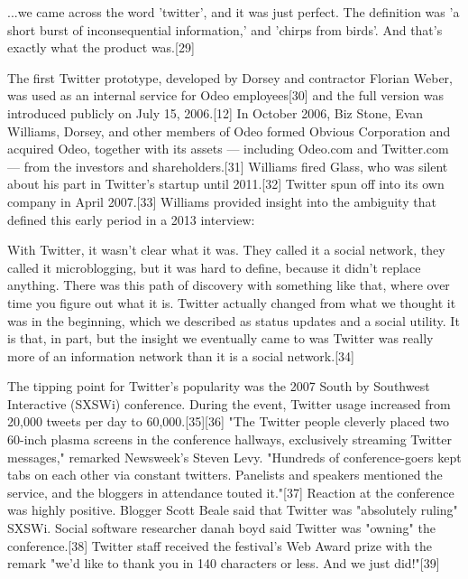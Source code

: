 \documentclass[12pt]{article}
\begin{document}
\begin{tcolorbox}
...we came across the word 'twitter', and it was just perfect. The definition was 'a short burst of inconsequential information,' and 'chirps from birds'. And that's exactly what the product was.[29]
\end{tcolorbox}





The first Twitter prototype, developed by Dorsey and contractor Florian Weber, was used as an internal service for Odeo employees[30] and the full version was introduced publicly on July 15, 2006.[12] In October 2006, Biz Stone, Evan Williams, Dorsey, and other members of Odeo formed Obvious Corporation and acquired Odeo, together with its assets — including Odeo.com and Twitter.com — from the investors and shareholders.[31] Williams fired Glass, who was silent about his part in Twitter's startup until 2011.[32] Twitter spun off into its own company in April 2007.[33] Williams provided insight into the ambiguity that defined this early period in a 2013 interview: 




\begin{tcolorbox}
With Twitter, it wasn't clear what it was. They called it a social network, they called it microblogging, but it was hard to define, because it didn't replace anything. There was this path of discovery with something like that, where over time you figure out what it is. Twitter actually changed from what we thought it was in the beginning, which we described as status updates and a social utility. It is that, in part, but the insight we eventually came to was Twitter was really more of an information network than it is a social network.[34]
\end{tcolorbox}





The tipping point for Twitter's popularity was the 2007 South by Southwest Interactive (SXSWi) conference. During the event, Twitter usage increased from 20,000 tweets per day to 60,000.[35][36] "The Twitter people cleverly placed two 60-inch plasma screens in the conference hallways, exclusively streaming Twitter messages," remarked Newsweek's Steven Levy. "Hundreds of conference-goers kept tabs on each other via constant twitters. Panelists and speakers mentioned the service, and the bloggers in attendance touted it."[37] Reaction at the conference was highly positive. Blogger Scott Beale said that Twitter was "absolutely ruling" SXSWi. Social software researcher danah boyd said Twitter was "owning" the conference.[38] Twitter staff received the festival's Web Award prize with the remark "we'd like to thank you in 140 characters or less. And we just did!"[39]
\end{document}
